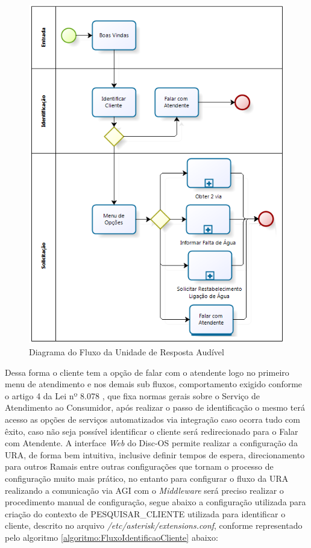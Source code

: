 \begin{figure}[H]
	\centering
	\caption{Diagrama do Fluxo da Unidade de Resposta Audível}
	\label{figura:fluxoURA}	
	\includegraphics{figuras/fluxo_ura.png}
\end{figure}


Dessa forma o cliente tem a opção de falar com o atendente logo no primeiro menu de atendimento e nos demais sub fluxos, comportamento exigido conforme o artigo 4 da Lei nº 8.078 \cite{leiAtendimentoAoConsumidor}, que fixa normas gerais sobre o Serviço de Atendimento ao Consumidor, após realizar o passo de identificação o mesmo terá acesso as opções de serviços automatizados via integração caso ocorra tudo com êxito, caso não seja possível identificar o cliente será redirecionado para o Falar com Atendente.
A interface \textit{Web} do Disc-OS permite realizar a configuração da URA, de forma bem intuitiva, inclusive definir tempos de espera, direcionamento para outros Ramais entre outras configurações que tornam o processo de configuração muito mais prático, no entanto para configurar o fluxo da URA realizando a comunicação via AGI com o \textit{Middleware} será preciso realizar o procedimento manual de configuração, segue abaixo a configuração utilizada para criação do contexto de PESQUISAR\_CLIENTE utilizada para identificar o cliente, descrito no arquivo \textit{/etc/asterisk/extensions.conf}, conforme representado pelo algoritmo \ref{algoritmo:FluxoIdentificaoCliente} abaixo:


